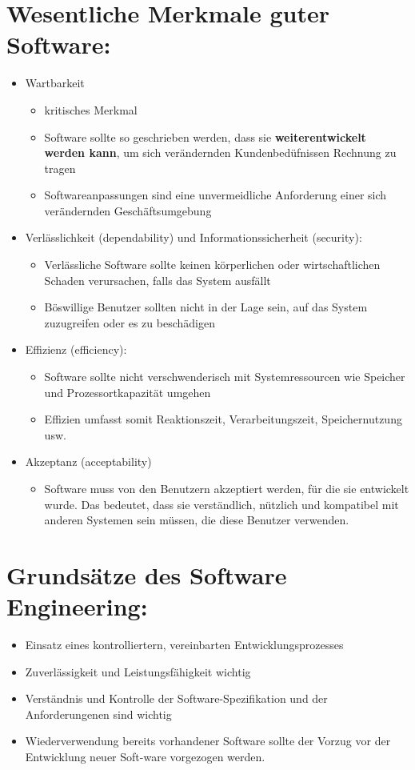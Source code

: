 \section{Wesentliche Merkmale guter Software:}
\begin{itemize}
    \item Wartbarkeit
    \begin{itemize}
        \item kritisches Merkmal 
        \item Software sollte so geschrieben werden, dass sie \textbf{weiterentwickelt werden kann}, um sich verändernden Kundenbedüfnissen Rechnung zu tragen
        \item Softwareanpassungen sind eine unvermeidliche Anforderung einer sich verändernden Geschäftsumgebung 
    \end{itemize}
    \item Verlässlichkeit (dependability) und Informationssicherheit (security):
    \begin{itemize}
        \item Verlässliche Software sollte keinen körperlichen oder wirtschaftlichen Schaden verursachen, falls das System ausfällt
        \item Böswillige Benutzer sollten nicht in der Lage sein, auf das System zuzugreifen oder es zu beschädigen
    \end{itemize}
    \item Effizienz (efficiency):
    \begin{itemize}
        \item Software sollte nicht verschwenderisch mit Systemressourcen wie Speicher und Prozessortkapazität umgehen
        \item Effizien umfasst somit Reaktionszeit, Verarbeitungszeit, Speichernutzung usw. 
    \end{itemize}
    \item Akzeptanz (acceptability)
    \begin{itemize}
        \item Software muss von den Benutzern akzeptiert werden, für die sie entwickelt wurde. Das bedeutet, dass sie verständlich, nützlich und kompatibel mit anderen Systemen sein müssen, die diese Benutzer verwenden.
    \end{itemize}
\end{itemize}

\section{Grundsätze des Software Engineering:}
\begin{itemize}
\item Einsatz eines kontrolliertern, vereinbarten Entwicklungsprozesses
\item Zuverlässigkeit und Leistungsfähigkeit wichtig
\item Verständnis und Kontrolle der Software-Spezifikation und der Anforderungenen sind wichtig
\item Wiederverwendung bereits vorhandener Software sollte der Vorzug vor der Entwicklung neuer Soft-ware vorgezogen werden.
\end{itemize}

